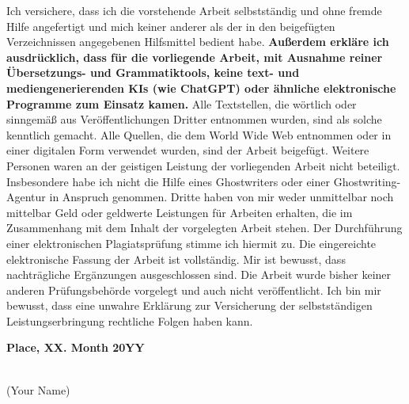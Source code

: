 \documentclass[runningheads,a4paper]{uwsese}
\newcommand{\authorName}{Your Name}
\newcommand{\place}{Place}
\newcommand{\submissionTime}{XX. Month 20YY}
\begin{document}
\noindent Ich versichere, dass ich die vorstehende Arbeit selbstständig und ohne fremde Hilfe angefertigt und mich keiner anderer als der in den beigefügten Verzeichnissen angegebenen Hilfsmittel bedient habe.
\textbf{Außerdem erkläre ich ausdrücklich, dass für die vorliegende Arbeit, mit Ausnahme reiner Übersetzungs- und Grammatiktools, keine text- und mediengenerierenden KIs (wie ChatGPT) oder ähnliche elektronische Programme zum Einsatz kamen.}
Alle Textstellen, die wörtlich oder sinngemäß aus Veröffentlichungen Dritter entnommen wurden, sind als solche kenntlich gemacht.
Alle Quellen, die dem World Wide Web entnommen oder in einer digitalen Form verwendet wurden, sind der Arbeit beigefügt.
\bigbreak
\noindent Weitere Personen waren an der geistigen Leistung der vorliegenden Arbeit nicht beteiligt.
Insbesondere habe ich nicht die Hilfe eines Ghostwriters oder einer Ghostwriting-Agentur in Anspruch genommen.
Dritte haben von mir weder unmittelbar noch mittelbar Geld oder geldwerte Leistungen für Arbeiten erhalten, die im Zusammenhang mit dem Inhalt der vorgelegten Arbeit stehen.
\bigbreak
\noindent Der Durchführung einer elektronischen Plagiatsprüfung stimme ich hiermit zu.
Die eingereichte elektronische Fassung der Arbeit ist vollständig.
Mir ist bewusst, dass nach\-träg\-li\-che Ergänzungen ausgeschlossen sind.
\bigbreak
\noindent Die Arbeit wurde bisher keiner anderen Prüfungsbehörde vorgelegt und auch nicht veröffentlicht.
Ich bin mir bewusst, dass eine unwahre Erklärung zur Versicherung der selbstständigen Leistungserbringung rechtliche Folgen haben kann.

\vspace*{2\baselineskip}

\noindent\textbf{\place, \submissionTime}
\vspace{1.5cm}

\noindent\dotfill\hspace*{8.0cm}\\
\noindent\hspace*{2cm}(\authorName) %



\thispagestyle{empty}
\end{document}
